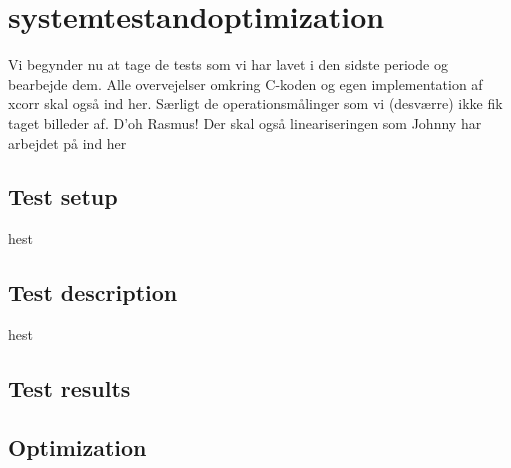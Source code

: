 \chapter{systemtestandoptimization}
Vi begynder nu at tage de tests som vi har lavet i den sidste periode og bearbejde dem. Alle overvejelser omkring C-koden og egen implementation af xcorr skal også ind her. Særligt de operationsmålinger som vi (desværre) ikke fik taget billeder af. D'oh Rasmus! Der skal også lineariseringen som Johnny har arbejdet på ind her
\section{Test setup}
hest

\section{Test description}
hest

\section{Test results}

\section{Optimization}